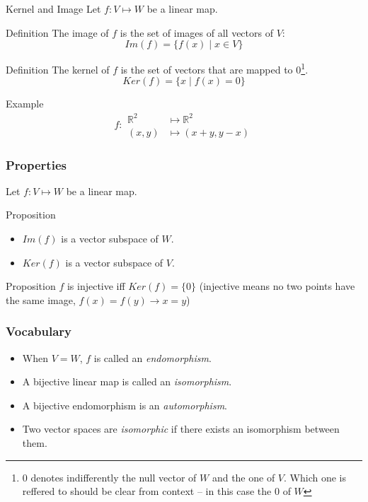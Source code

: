 \documentclass{beamer}
\begin{document}
\begin{frame}{Kernel and Image}
  Let $f: V \mapsto W$ be a linear map.

  \begin{block}{Definition}
    The image of $f$ is the set of images of all vectors of $V$:
    \[Im(f) = \{ f(x) \mid x \in V \} \]
  \end{block}

  \begin{block}{Definition}
    The kernel of $f$ is the set of vectors that are mapped to $0$\footnote{$0$ denotes indifferently the null vector of $W$ and the one of $V$. Which one is reffered to should be clear from context -- in this case the $0$ of $W$}.
    \[Ker(f) = \{ x \mid f(x) = 0\}\]
  \end{block}
\end{frame}

\begin{frame}
\begin{exampleblock}{Example}
  \[f: \begin{aligned} \mathbb{R}^2 &\mapsto \mathbb{R}^2\\ (x,y) &\mapsto (x + y, y - x) \end{aligned}\]

  \begin{center}
    
  \end{center}
  
\end{exampleblock}

\end{frame}

\begin{frame}
  \frametitle{Properties}
  Let $f: V \mapsto W$ be a linear map. 
  \begin{block}{Proposition}
    \begin{itemize}
    \item $Im(f)$ is a vector subspace of $W$.
    \item $Ker(f)$ is a vector subspace of $V$. 
    \end{itemize}
  \end{block}

  \begin{block}{Proposition}
    $f$ is injective iff $Ker(f) = \{0\}$ (injective means no two points have the same image, $f(x) = f(y) \rightarrow x = y$)
  \end{block}
\end{frame}


\begin{frame}
  \frametitle{Vocabulary}
  \begin{itemize}
  \item When $V = W$, $f$ is called an \emph{endomorphism}.
  \item A bijective linear map is called an \emph{isomorphism}.
  \item A bijective endomorphism is an \emph{automorphism}.
  \item Two vector spaces are \emph{isomorphic} if there exists an isomorphism between them.
  \end{itemize}
\end{frame}
\end{document}
